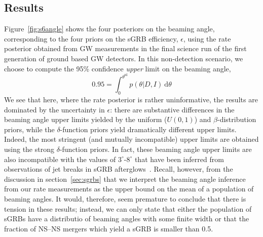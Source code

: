 \documentclass[twocolumn,nofootinbib]{revtex4-1}
\newcommand{\cbcrate}{{{\mathcal R}}}
\newcommand{\diff}{{\mathrm d}}
\newcommand{\rhostar}{{\rho^*}}
\newcommand{\BNS}{\ac{NS}--\ac{NS}\xspace}
\begin{document}

\subsection{Results}
Figure~\ref{fig:s6angle} shows the four posteriors on the beaming angle, corresponding to the four priors on the \ac{sGRB} efficiency, $\epsilon$, using the rate posterior obtained from \ac{GW} measurements in the final science run of the first generation of ground based \ac{GW} detectors.
In this non-detection scenario, we choose to compute the 95\% confidence \emph{upper} limit on the beaming angle,
\begin{equation}
    \label{eq:beaming_upper_limit}
    0.95 = \int_0^{\theta^{\mathrm{ul}}} p(\theta|D,I)~\diff \theta
\end{equation}
%
We see that here, where the rate posterior is rather uninformative, the results are dominated by the uncertainty in $\epsilon$: there are substantive differences in the beaming angle upper limits yielded by the uniform ($U(0,1)$) and $\beta$-distribution priors, while the $\delta$-function priors yield dramatically different upper limits.
Indeed, the most stringent (and mutually incompatible) upper limits are obtained using the strong $\delta$-function priors.
In fact, these beaming angle upper limits are also incompatible with the values of $3^{\circ}\mbox{-}8^{\circ}$ that have been inferred from observations of jet breaks in \ac{sGRB} afterglows~\cite{Fong:2013lba,2006MNRAS.367L..42P, 2012A&A...538L...7N}.
Recall, however, from the discussion in section~\ref{sec:sgrbs} that we interpret the beaming angle inference from our rate measurements as the upper bound on the mean of a population of beaming angles.
It would, therefore, seem premature to conclude that there is tension in these results; instead, we can only state that either the population of \acp{sGRB} have a distributio of beaming angles with some finite width or that the fraction of \BNS mergers which yield a \ac{sGRB} is smaller than 0.5.
\end{document}
